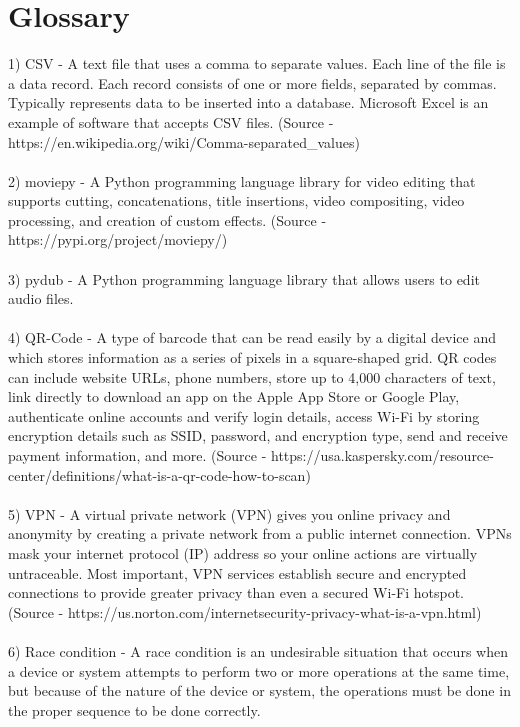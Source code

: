 \section{Glossary}

1) CSV - A text file that uses a comma to separate values. Each line of the file is a data record. Each record consists of one or more 
fields, separated by commas. Typically represents data to be inserted into a database. Microsoft Excel is an example of software that
accepts CSV files. (Source - https://en.wikipedia.org/wiki/Comma-separated_values)\\~\\

2) moviepy - A Python programming language library for video editing that supports cutting, concatenations, title insertions, video compositing, 
video processing, and creation of custom effects. (Source - https://pypi.org/project/moviepy/)\\~\\

3) pydub - A Python programming language library that allows users to edit audio files.\\~\\

4) QR-Code - A type of barcode that can be read easily by a digital device and which stores information as a series of pixels in a square-shaped grid.
QR codes can include website URLs, phone numbers, store up to 4,000 characters of text, link directly to download an app on the Apple App 
Store or Google Play, authenticate online accounts and verify login details, access Wi-Fi by storing encryption details such as SSID, password, 
and encryption type, send and receive payment information, and more. 
(Source - https://usa.kaspersky.com/resource-center/definitions/what-is-a-qr-code-how-to-scan)\\~\\

5) VPN - A virtual private network (VPN) gives you online privacy and anonymity by creating a private network from a public internet connection. 
VPNs mask your internet protocol (IP) address so your online actions are virtually untraceable. Most important, VPN services establish 
secure and encrypted connections to provide greater privacy than even a secured Wi-Fi hotspot. 
(Source - https://us.norton.com/internetsecurity-privacy-what-is-a-vpn.html)\\~\\

6) Race condition - A race condition is an undesirable situation that occurs when a device or system attempts to perform two or more operations at the same time, 
but because of the nature of the device or system, the operations must be done in the proper sequence to be done correctly.\\~\\

